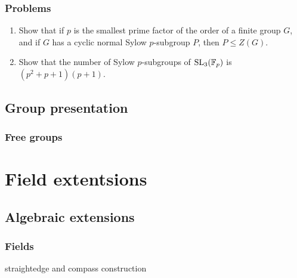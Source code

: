 \documentclass{../note}
\begin{document}
\section*{Problems}
\begin{enumerate}
\item Show that if $p$ is the smallest prime factor of the order of a finite group $G$, and if $G$ has a cyclic normal Sylow $p$-subgroup $P$, then $P\le Z(G)$.
\item Show that the number of Sylow $p$-subgroups of $\mathrm{SL}_3(\mathbb{F}_p)$ is $(p^2+p+1)(p+1)$.
\end{enumerate}




\chapter{Group presentation}

\section{Free groups}










\part{Field extentsions}

\chapter{Algebraic extensions}

\section{Fields}
\begin{prb}
\end{prb}
\begin{prb}
\end{prb}
\begin{prb}
\end{prb}
\begin{prb}
\end{prb}
straightedge and compass construction
\end{document}
